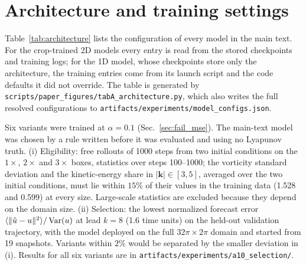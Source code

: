 \section{Architecture and training settings}
\label{app:architecture}

Table~\ref{tab:architecture} lists the configuration of every model in
the main text. For the crop-trained 2D models every entry is read from
the stored checkpoints and training logs; for the 1D model, whose
checkpoints store only the architecture, the training entries come from
its launch script and the code defaults it did not override. The table is
generated by \texttt{scripts/paper\_figures/tabA\_architecture.py}, which
also writes the full resolved configurations to
\texttt{artifacts/experiments/model\_configs.json}.

\begin{table}[htbp]
\caption{Architecture and training configuration of the main-text models.
Reaches are radius $\times$ layers in sites; the propagator mixes over a
radius $w$ in each of $n_\ell$ blocks of width $d_m$ (MLP ratio 4, output
projection initialized to zero). Stage~A trains the autoencoder, Stage~B
the propagator with forced-halo rollouts (2D) or on whole periodic
domains (1D); the rollout length is ramped $2\to k_{\mathrm{mid}}$ over
the first $58\%$ of Stage~B and to $k_{\max}$ by $70\%$. All runs use
AdamW with linear warm-up and cosine decay, weight decay $10^{-5}$,
gradient clipping at 1, and training seed 0. ``2D KS, Part~II'' is the
model of the data assimilation experiments (Sec.~\ref{sec:da_setting}): the 2D KS recipe with 12
channels, trained on fields carrying one fixed realization of Gaussian noise of standard deviation
$0.1$ (standardized units), against which its validation error is also measured.
$^a$A signed latent spatial-coherence penalty (weight 0.01).}
\label{tab:architecture}
\end{table}

 Six variants were trained at
$\alpha=0.1$ (Sec.~\ref{sec:fail_mse}). The main-text model was chosen by a
rule written before it was evaluated and using no Lyapunov truth. (i)
Eligibility: free rollouts of 1000 steps from two initial conditions on
the $1\times$, $2\times$ and $3\times$ boxes, statistics over steps
100--1000; the vorticity standard deviation and the kinetic-energy share
in $|\bm k|\in[3,5]$, averaged over the two initial conditions, must lie
within $15\%$ of their values in the training data (1.528 and 0.599) at
every size. Large-scale statistics are excluded because they depend on the
domain size. (ii) Selection: the lowest normalized forecast error
$\langle\|\hat u-u\|^2\rangle/\operatorname{Var}(u)$ at lead $k=8$ (1.6 time units)
on the held-out validation trajectory, with the model deployed on the
full $32\pi\times2\pi$ domain and started from 19 snapshots. Variants
within $2\%$ would be separated by the smaller deviation in (i). Results
for all six variants are in \texttt{artifacts/experiments/a10\_selection/}.
